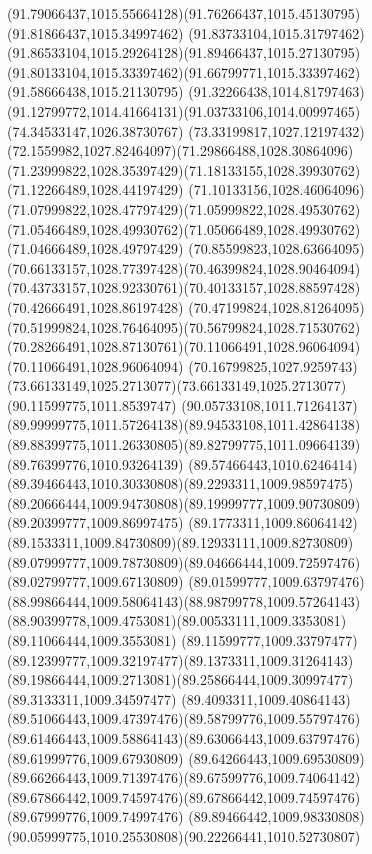 {{  \curveto(91.79066437,1015.55664128)(91.76266437,1015.45130795)(91.81866437,1015.34997462)
  \curveto(91.83733104,1015.31797462)(91.86533104,1015.29264128)(91.89466437,1015.27130795)
  \curveto(91.80133104,1015.33397462)(91.66799771,1015.33397462)(91.58666438,1015.21130795)
  \curveto(91.32266438,1014.81797463)(91.12799772,1014.41664131)(91.03733106,1014.00997465)
  \lineto(74.34533147,1026.38730767)
  \curveto(73.33199817,1027.12197432)(72.1559982,1027.82464097)(71.29866488,1028.30864096)
  \curveto(71.23999822,1028.35397429)(71.18133155,1028.39930762)(71.12266489,1028.44197429)
  \curveto(71.10133156,1028.46064096)(71.07999822,1028.47797429)(71.05999822,1028.49530762)
  \curveto(71.05466489,1028.49930762)(71.05066489,1028.49930762)(71.04666489,1028.49797429)
  \curveto(70.85599823,1028.63664095)(70.66133157,1028.77397428)(70.46399824,1028.90464094)
  \curveto(70.43733157,1028.92330761)(70.40133157,1028.88597428)(70.42666491,1028.86197428)
  \curveto(70.47199824,1028.81264095)(70.51999824,1028.76464095)(70.56799824,1028.71530762)
  \curveto(70.28266491,1028.87130761)(70.11066491,1028.96064094)(70.11066491,1028.96064094)
  \curveto(70.16799825,1027.9259743)(73.66133149,1025.2713077)(73.66133149,1025.2713077)
  \lineto(90.11599775,1011.8539747)
  \curveto(90.05733108,1011.71264137)(89.99999775,1011.57264138)(89.94533108,1011.42864138)
  \curveto(89.88399775,1011.26330805)(89.82799775,1011.09664139)(89.76399776,1010.93264139)
  \curveto(89.57466443,1010.6246414)(89.39466443,1010.30330808)(89.2293311,1009.98597475)
  \curveto(89.20666444,1009.94730808)(89.19999777,1009.90730809)(89.20399777,1009.86997475)
  \curveto(89.1773311,1009.86064142)(89.1533311,1009.84730809)(89.12933111,1009.82730809)
  \curveto(89.07999777,1009.78730809)(89.04666444,1009.72597476)(89.02799777,1009.67130809)
  \curveto(89.01599777,1009.63797476)(88.99866444,1009.58064143)(88.98799778,1009.57264143)
  \curveto(88.90399778,1009.4753081)(89.00533111,1009.3353081)(89.11066444,1009.3553081)
  \curveto(89.11599777,1009.33797477)(89.12399777,1009.32197477)(89.1373311,1009.31264143)
  \curveto(89.19866444,1009.2713081)(89.25866444,1009.30997477)(89.3133311,1009.34597477)
  \curveto(89.4093311,1009.40864143)(89.51066443,1009.47397476)(89.58799776,1009.55797476)
  \curveto(89.61466443,1009.58864143)(89.63066443,1009.63797476)(89.61999776,1009.67930809)
  \curveto(89.64266443,1009.69530809)(89.66266443,1009.71397476)(89.67599776,1009.74064142)
  \curveto(89.67866442,1009.74597476)(89.67866442,1009.74597476)(89.67999776,1009.74997476)
  \curveto(89.89466442,1009.98330808)(90.05999775,1010.25530808)(90.22266441,1010.52730807)
}}
